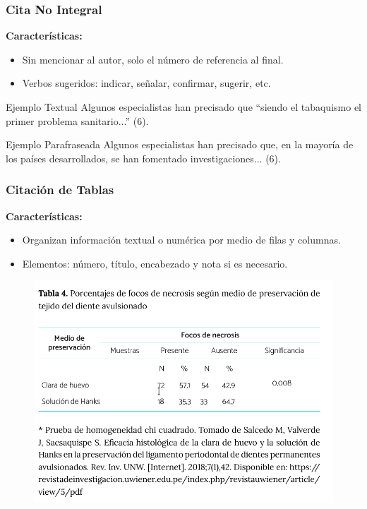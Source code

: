 \documentclass[
11pt, %
]{beamer}
\begin{document}
\begin{frame}
	\frametitle{Cita No Integral}

	\textbf{Características:}
	\begin{itemize}
		\item Sin mencionar al autor, solo el número de referencia al final.
		\item Verbos sugeridos: indicar, señalar, confirmar, sugerir, etc.
	\end{itemize}

	\begin{exampleblock}{Ejemplo Textual}
		Algunos especialistas han precisado que “siendo el tabaquismo el primer problema sanitario...” (6).
	\end{exampleblock}

	\begin{exampleblock}{Ejemplo Parafraseada}
		Algunos especialistas han precisado que, en la mayoría de los países desarrollados, se han fomentado investigaciones... (6).
	\end{exampleblock}

\end{frame}

\begin{frame}
	\frametitle{Citación de Tablas}

	\textbf{Características:}
	\begin{itemize}
		\item Organizan información textual o numérica por medio de filas y columnas.
		\item Elementos: número, título, encabezado y nota si es necesario.
	\end{itemize}

	\begin{figure}[H]
		\centering
		\includegraphics[width=0.5\linewidth]{images/Screenshot_20250206_054556.png}
	\end{figure}

\end{frame}
\end{document}
